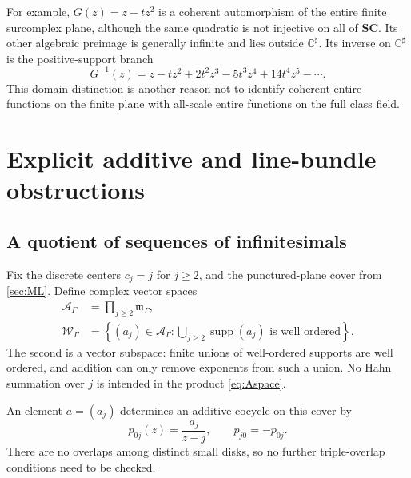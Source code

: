\documentclass[11pt,letterpaper]{article}
\theoremstyle{definition}
\theoremstyle{remark}
\newcommand{\SC}{\mathbf{SC}}
\newcommand{\C}{\mathbb C}
\newcommand{\mm}{\mathfrak m_\Gamma}
\newcommand{\sh}{^{\sharp}}
\newcommand{\supp}{\operatorname{supp}}
\numberwithin{equation}{section}
\begin{document}
For example, $G(z)=z+t z^2$ is a coherent automorphism of the entire finite surcomplex plane, although the same quadratic is not injective on all of $\SC$. Its other algebraic preimage is generally infinite and lies outside $\C\sh$. Its inverse on $\C\sh$ is the positive-support branch
\[
 G^{-1}(z)=z-tz^2+2t^2z^3-5t^3z^4+14t^4z^5-\cdots.
\]
This domain distinction is another reason not to identify coherent-entire functions on the finite plane with all-scale entire functions on the full class field.

\section{Explicit additive and line-bundle obstructions}\label{sec:obstructions}
\subsection{A quotient of sequences of infinitesimals}
Fix the discrete centers $c_j=j$ for $j\ge2$, and the punctured-plane cover from \cref{sec:ML}. Define complex vector spaces
\begin{align}
 \mathcal A_\Gamma&=\prod_{j\ge2}\mm,\label{eq:Aspace}\\
 \mathcal W_\Gamma&=\left\{(a_j)\in\mathcal A_\Gamma:
 \bigcup_{j\ge2}\supp(a_j)\text{ is well ordered}\right\}.
 \label{eq:Wspace}
\end{align}
The second is a vector subspace: finite unions of well-ordered supports are well ordered, and addition can only remove exponents from such a union. No Hahn summation over $j$ is intended in the product \eqref{eq:Aspace}.

An element $a=(a_j)$ determines an additive cocycle on this cover by
\begin{equation}\label{eq:addcocycle}
 p_{0j}(z)=\frac{a_j}{z-j},\qquad p_{j0}=-p_{0j}.
\end{equation}
There are no overlaps among distinct small disks, so no further triple-overlap conditions need to be checked.
\end{document}
